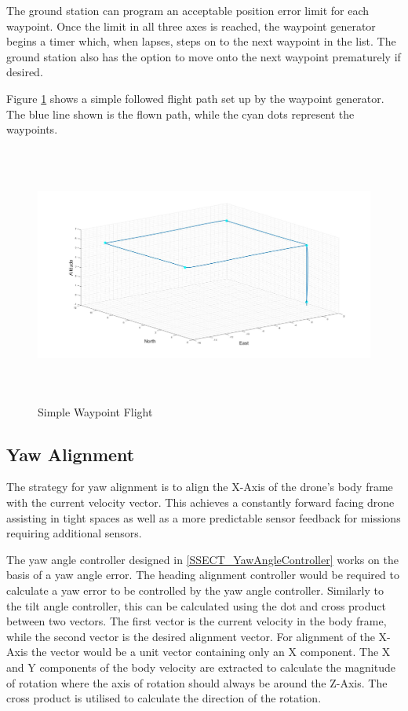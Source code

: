 		The ground station can program an acceptable position error limit for each waypoint. Once the limit in all three axes is reached, the waypoint generator begins a timer which, when lapses, steps on to the next waypoint in the list. The ground station also has the option to move onto the next waypoint prematurely if desired.
		
		Figure \ref{IM_WaypointFlight} shows a simple followed flight path set up by the waypoint generator. The blue line shown is the flown path, while the cyan dots represent the waypoints.
		
		\begin{figure}[H]
			\centering
			\includegraphics[height = 8.5cm]{../References/Diagrams/SimpleWaypointFlight.jpg}     
			\caption{Simple Waypoint Flight}
			\label{IM_WaypointFlight}
		\end{figure}
		
		\subsection{Yaw Alignment}
		The strategy for yaw alignment is to align the X-Axis of the drone's body frame with the current velocity vector. This achieves a constantly forward facing drone assisting in tight spaces as well as a more predictable sensor feedback for missions requiring additional sensors.
		
		The yaw angle controller designed in \ref{SSECT_YawAngleController} works on the basis of a yaw angle error. The heading alignment controller would be required to calculate a yaw error to be controlled by the yaw angle controller. Similarly to the tilt angle controller, this can be calculated using the dot and cross product between two vectors. The first vector is the current velocity in the body frame, while the second vector is the desired alignment vector. For alignment of the X-Axis the vector would be a unit vector containing only an X component. The X and Y components of the body velocity are extracted to calculate the magnitude of rotation where the axis of rotation should always be around the Z-Axis. The cross product is utilised to calculate the direction of the rotation. 
		
